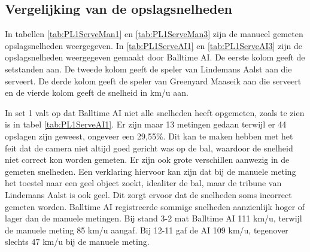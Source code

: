 \subsection{Vergelijking van de opslagsnelheden}
In tabellen \ref{tab:PL1ServeMan1} en \ref{tab:PL1ServeMan3} zijn de manueel gemeten opslagsnelheden weergegeven. In \ref{tab:PL1ServeAI1} en \ref{tab:PL1ServeAI3} zijn  de opslagsnelheden weergegeven gemaakt door Balltime AI. De eerste kolom geeft de setstanden aan. De tweede kolom geeft de speler van Lindemans Aalst aan die serveert. De derde kolom geeft de speler van Greenyard Maaseik aan die serveert en de vierde kolom geeft de snelheid in km/u aan.

In set 1 valt op dat Balltime AI niet alle snelheden heeft opgemeten, zoals te zien is in tabel \ref{tab:PL1ServeAI1}. Er zijn maar 13 metingen gedaan terwijl er 44 opslagen zijn geweest, ongeveer een 29,55\%. Dit kan te maken hebben met het feit dat de camera niet altijd goed gericht was op de bal, waardoor de snelheid niet correct kon worden gemeten. Er zijn ook grote verschillen aanwezig in de gemeten snelheden. Een verklaring hiervoor kan zijn dat bij de manuele meting het toestel naar een geel object zoekt, idealiter de bal, maar de tribune van Lindemans Aalst is ook geel. Dit zorgt ervoor dat de snelheden soms incorrect gemeten worden. 
Balltime AI registreerde sommige snelheden aanzienlijk hoger of lager dan de manuele metingen. Bij stand 3-2 mat Balltime AI 111 km/u, terwijl de manuele meting 85 km/u aangaf. Bij 12-11 gaf de AI 109 km/u, tegenover slechts 47 km/u bij de manuele meting.

